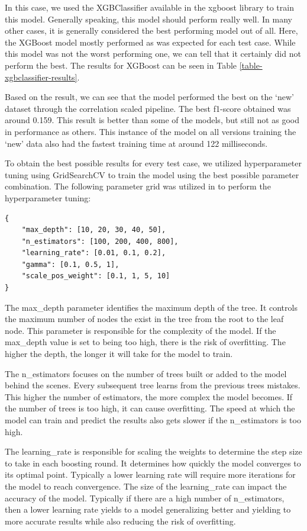In this case, we used the XGBClassifier available in the xgboost library to train this model. Generally speaking, this model should perform really well. In many other cases, it is generally considered the best performing model out of all. Here, the XGBoost model mostly performed as was expected for each test case. While this model was not the worst performing one, we can tell that it certainly did not perform the best. The results for XGBoost can be seen in Table \ref{table-xgbclassifier-results}.



Based on the result, we can see that the model performed the best on the `new' dataset through the correlation scaled pipeline. The best f1-score obtained was around 0.159. This result is better than some of the models, but still not as good in performance as others. This instance of the model on all versions training the `new' data also had the fastest training time at around 122 milliseconds.

To obtain the best possible results for every test case, we utilized hyperparameter tuning using GridSearchCV to train the model using the best possible parameter combination. The following parameter grid was utilized in to perform the hyperparameter tuning:

\begin{lstlisting}
{
    "max_depth": [10, 20, 30, 40, 50],
    "n_estimators": [100, 200, 400, 800],
    "learning_rate": [0.01, 0.1, 0.2],
    "gamma": [0.1, 0.5, 1],
    "scale_pos_weight": [0.1, 1, 5, 10]
}
\end{lstlisting}

The max\_depth parameter identifies the maximum depth of the tree. It controls the maximum number of nodes the exist in the tree from the root to the leaf node. This parameter is responsible for the complexity of the model. If the max\_depth value is set to being too high, there is the risk of overfitting. The higher the depth, the longer it will take for the model to train.

The n\_estimators focuses on the number of trees built or added to the model behind the scenes. Every subsequent tree learns from the previous trees mistakes. This higher the number of estimators, the more complex the model becomes. If the number of trees is too high, it can cause overfitting. The speed at which the model can train and predict the results also gets slower if the n\_estimators is too high. 

The learning\_rate is responsible for scaling the weights to determine the step size to take in each boosting round. It determines how quickly the model converges to its optimal point. Typically a lower learning rate will require more iterations for the model to reach convergence. The size of the learning\_rate can impact the accuracy of the model. Typically if there are a high number of n\_estimators, then a lower learning rate yields to a model generalizing better and yielding to more accurate results while also reducing the risk of overfitting. 

